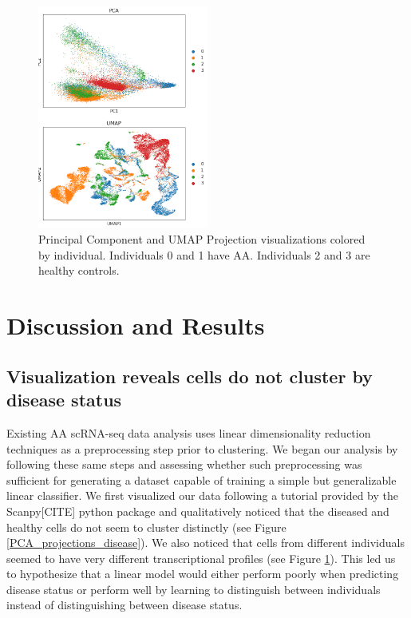 \documentclass{article}
\begin{document}
\begin{figure}
  \centering
  \includegraphics[width=0.5\textwidth]{individual.png}
  \caption{Principal Component and UMAP Projection visualizations colored by individual. Individuals 0 and 1 have AA. Individuals 2 and 3 are healthy controls.}
  \label{PCA_projections_individual}
\end{figure}


\section{Discussion and Results}

\subsection{Visualization reveals cells do not cluster by disease status}
Existing AA scRNA-seq data analysis uses linear dimensionality reduction techniques as a preprocessing step prior to clustering.
We began our analysis by following these same steps and assessing whether such preprocessing was sufficient for generating a dataset capable of training a simple but generalizable linear classifier.
We first visualized our data following a tutorial provided by the Scanpy[CITE] python package and qualitatively noticed that the diseased and healthy cells do not seem to cluster distinctly (see Figure \ref{PCA_projections_disease}).
We also noticed that cells from different individuals seemed to have very different transcriptional profiles (see Figure \ref{PCA_projections_individual}).
This led us to hypothesize that a linear model would either perform poorly when predicting disease status or perform well by learning to distinguish between individuals instead of distinguishing between disease status.
\end{document}
